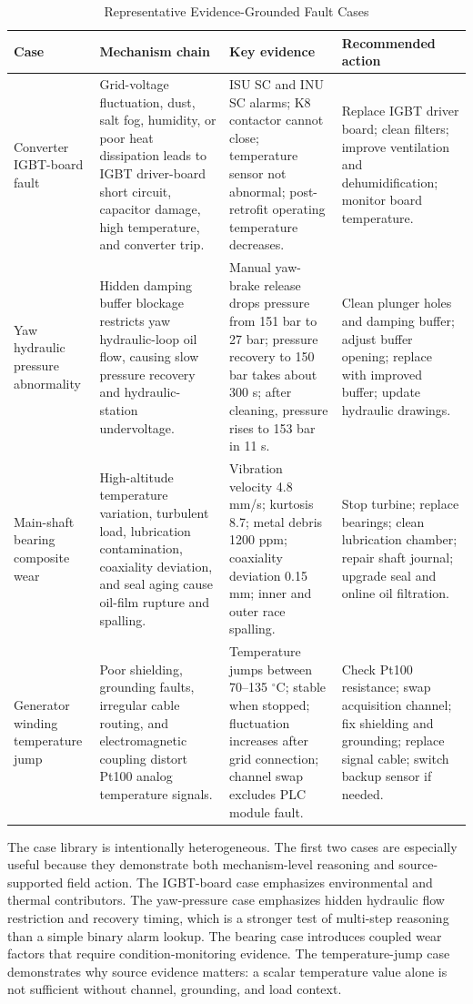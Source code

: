 \documentclass[lettersize,journal]{IEEEtran}
\begin{document}
\begin{table}[htbp]
\caption{Representative Evidence-Grounded Fault Cases}
\label{tab:cases}
\centering
\begin{tabular}{p{}p{}p{}p{}}
\toprule
Case & Mechanism chain & Key evidence & Recommended action \\
\midrule
Converter IGBT-board fault &
Grid-voltage fluctuation, dust, salt fog, humidity, or poor heat dissipation leads to IGBT driver-board short circuit, capacitor damage, high temperature, and converter trip. &
ISU SC and INU SC alarms; K8 contactor cannot close; temperature sensor not abnormal; post-retrofit operating temperature decreases. &
Replace IGBT driver board; clean filters; improve ventilation and dehumidification; monitor board temperature. \\
\midrule
Yaw hydraulic pressure abnormality &
Hidden damping buffer blockage restricts yaw hydraulic-loop oil flow, causing slow pressure recovery and hydraulic-station undervoltage. &
Manual yaw-brake release drops pressure from 151 bar to 27 bar; pressure recovery to 150 bar takes about 300 s; after cleaning, pressure rises to 153 bar in 11 s. &
Clean plunger holes and damping buffer; adjust buffer opening; replace with improved buffer; update hydraulic drawings. \\
\midrule
Main-shaft bearing composite wear &
High-altitude temperature variation, turbulent load, lubrication contamination, coaxiality deviation, and seal aging cause oil-film rupture and spalling. &
Vibration velocity 4.8 mm/s; kurtosis 8.7; metal debris 1200 ppm; coaxiality deviation 0.15 mm; inner and outer race spalling. &
Stop turbine; replace bearings; clean lubrication chamber; repair shaft journal; upgrade seal and online oil filtration. \\
\midrule
Generator winding temperature jump &
Poor shielding, grounding faults, irregular cable routing, and electromagnetic coupling distort Pt100 analog temperature signals. &
Temperature jumps between 70--135 $^\circ$C; stable when stopped; fluctuation increases after grid connection; channel swap excludes PLC module fault. &
Check Pt100 resistance; swap acquisition channel; fix shielding and grounding; replace signal cable; switch backup sensor if needed. \\
\bottomrule
\end{tabular}
\end{table}

The case library is intentionally heterogeneous. The first two cases are especially useful because they demonstrate both mechanism-level reasoning and source-supported field action. The IGBT-board case emphasizes environmental and thermal contributors. The yaw-pressure case emphasizes hidden hydraulic flow restriction and recovery timing, which is a stronger test of multi-step reasoning than a simple binary alarm lookup. The bearing case introduces coupled wear factors that require condition-monitoring evidence. The temperature-jump case demonstrates why source evidence matters: a scalar temperature value alone is not sufficient without channel, grounding, and load context.
\end{document}
